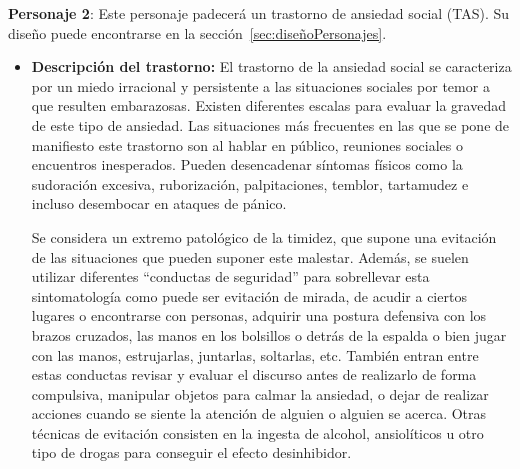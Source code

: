 \documentclass[12pt, a4paper,twoside,titlepage]{book}
\begin{document}
\textbf{Personaje 2}: Este personaje padecerá un trastorno de ansiedad social (TAS). Su diseño puede encontrarse en la sección~\ref{sec:diseñoPersonajes}.

\begin{itemize}
    \item {\textbf{Descripción del trastorno:}
     El trastorno de la ansiedad social se caracteriza por un miedo irracional y persistente a las situaciones sociales por temor a que resulten embarazosas. Existen diferentes escalas para evaluar la gravedad de este tipo de ansiedad. Las situaciones más frecuentes en las que se pone de manifiesto este trastorno son al hablar en público, reuniones sociales o encuentros inesperados. Pueden desencadenar síntomas físicos como la sudoración excesiva, ruborización, palpitaciones, temblor, tartamudez e incluso desembocar en ataques de pánico. 
     
     Se considera un extremo patológico de la timidez, que supone una evitación de las situaciones que pueden suponer este malestar. Además, se suelen utilizar diferentes “conductas de seguridad” para sobrellevar esta sintomatología como puede ser evitación de mirada, de acudir a ciertos lugares o encontrarse con personas, adquirir una postura defensiva con los brazos cruzados, las manos en los bolsillos o detrás de la espalda o bien jugar con las manos, estrujarlas, juntarlas, soltarlas, etc. También entran entre estas conductas revisar y evaluar el discurso antes de realizarlo de forma compulsiva, manipular objetos para calmar la ansiedad, o dejar de realizar acciones cuando se siente la atención de alguien o alguien se acerca. Otras técnicas de evitación consisten en la ingesta de alcohol, ansiolíticos u otro tipo de drogas para conseguir el efecto desinhibidor.  
     
}
\end{itemize}
\end{document}
